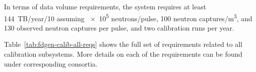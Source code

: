 

In terms of data volume requirements, the  system requires at least \num{144}~TB/year/\SI{10}{\kt} assuming \num{e5} neutrons/pulse, \num{100} neutron captures/\si{\cubic\m},
and \num{130} observed neutron captures per pulse, and two calibration runs per year. 

Table~\ref{tab:fdgen-calib-all-reqs} shows the full set of requirements related to all calibration subsystems. More details on each of the requirements can be found under corresponding consortia.   

%



\begin{comment}

\begin{dunetable}
[Top-level specifications for calibration subsystems]
{p{0.45\linewidth}p{0.25\linewidth}p{0.25\linewidth}}
{tab:fdgen-calib-toplevel-reqs} 
{List of Top-Level Specifications for the Calibration Subsystems. Global DUNE requirements are listed in bold.}   Quantity/Parameter	& Specification	& Goal		 \\ \toprowrule      
{\bf Noise from calibration devices}	 & $\ll$ 1000 enc   & \\ \colhline    
{\bf Max. \efield near calibration devices} & < 30 kV/cm & <15 kV/cm \\ \colhline     
Ionization Laser \efield measurement precision & 1\% & <1\% \\ \colhline
Ionization Laser \efield measurement coverage & > 75\% & 100\% \\ \colhline
Ionization Laser \efield measurement granularity & < \num{30}x\num{30}x\num{30}~cm & \num{10}x\num{10}x\num{10}~cm \\ \colhline
Laser beam location precision & 0.5 mrad & 0.5 mrad \\ \colhline
Neutron source coverage & > 75\% & 100\% \\ \colhline %
Ionization laser data volume (per 10 kton) & 90~TB/year & 185~TB/year\\ \colhline
Neutron source data volume (per 10~kton) & 84~TB/year & 168~TB/year\\ \colhline
Rate of 9~MeV capture $\gamma$-events inside the proposed radioactive source & < 1~kHz & \\ 
\end{dunetable}
\end{comment}

